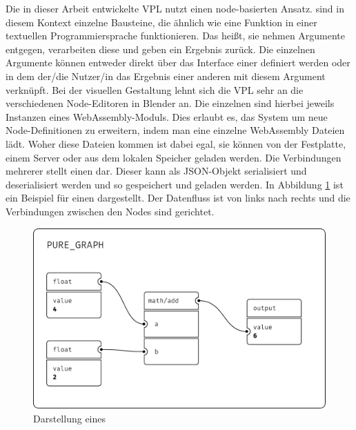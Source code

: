 \documentclass[ngerman]{article}
\begin{document}
Die in dieser Arbeit entwickelte VPL nutzt einen node-basierten Ansatz. 
 sind in diesem Kontext einzelne Bausteine, die ähnlich wie eine Funktion in einer textuellen Programmiersprache funktionieren.
Das heißt, sie nehmen Argumente entgegen, verarbeiten diese und geben ein Ergebnis zurück.
\br
Die einzelnen Argumente können entweder direkt über das Interface einer  definiert werden oder in dem der/die Nutzer/in das Ergebnis einer anderen  mit diesem Argument verknüpft.
Bei der visuellen Gestaltung lehnt sich die VPL sehr an die verschiedenen Node-Editoren in Blender an.
\br
Die einzelnen  sind hierbei jeweils Instanzen eines WebAssembly-Moduls. 
Dies erlaubt es, das System um neue Node-Definitionen zu erweitern, indem man eine einzelne WebAssembly Dateien lädt.
Woher diese Dateien kommen ist dabei egal, sie können von der Festplatte, einem Server oder aus dem lokalen Speicher geladen werden.
\br
Die Verbindungen mehrerer  stellt einen  dar. 
Dieser  kann als JSON-Objekt serialisiert und deserialisiert werden und so gespeichert und geladen werden.
\br
In Abbildung \ref{sec:PURE_GRAPH} ist ein Beispiel für einen  dargestellt. 
Der Datenfluss ist von links nach rechts und die Verbindungen zwischen den Nodes sind gerichtet.


\begin{figure}[htbp]
    \centering
    \begin{minipage}[b]{0.8\textwidth}
        \centering
        \includegraphics[width=\textwidth]{graphics/PURE_GRAPH.pdf}
        \caption{Darstellung eines }
        \label{sec:PURE_GRAPH}
    \end{minipage}
\end{figure}
\end{document}
